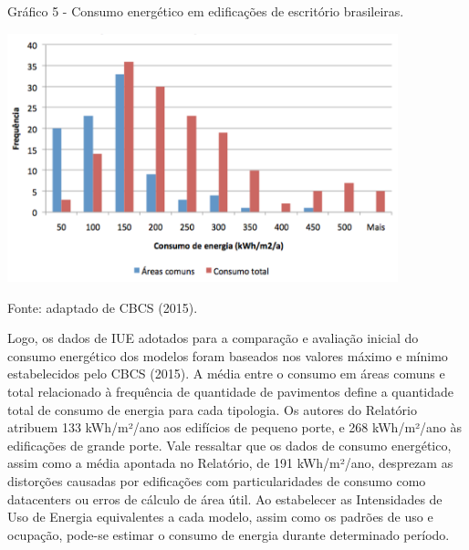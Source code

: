     \begin{graph}
        \par \small Gráfico 5 - Consumo energético em edificações de escritório brasileiras.
        \begin{minipage}[ht]{1\textwidth}\centering
            \includegraphics[width=0.85\textwidth]{figures/fig9_consumo-total-das-edificacoes-levantadas_cbcs_2015.png}            
        \end{minipage}
        \begin{flushleft}
            \par \small Fonte: adaptado de CBCS (2015).
        \end{flushleft}
    \end{graph}

\noindent Logo, os dados de IUE adotados para a comparação e avaliação inicial do consumo energético dos modelos foram baseados nos valores máximo e mínimo estabelecidos pelo CBCS (2015). A média entre o consumo em áreas comuns e total relacionado à frequência de quantidade de pavimentos define a quantidade total de consumo de energia para cada tipologia.\vspace*{0.3cm} \newline
Os autores do Relatório atribuem 133 kWh/m²/ano aos edifícios de pequeno porte, e 268 kWh/m²/ano às edificações de grande porte. Vale ressaltar que os dados de consumo energético, assim como a média apontada no Relatório, de 191 kWh/m²/ano, desprezam as distorções causadas por edificações com particularidades de consumo como datacenters ou erros de cálculo de área útil.\vspace*{0.3cm} \newline
Ao estabelecer as Intensidades de Uso de Energia equivalentes a cada modelo, assim como os padrões de uso e ocupação, pode-se estimar o consumo de energia durante determinado período.

